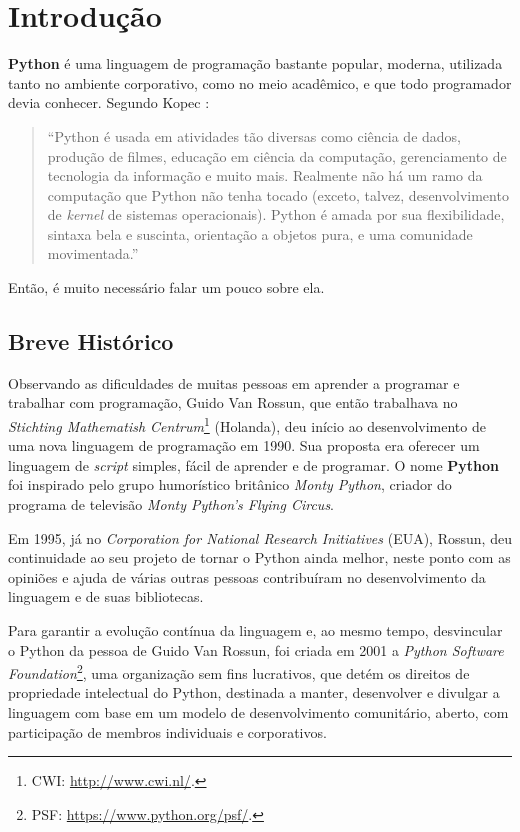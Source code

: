 \documentclass[
]{book}
\begin{document}
\hypertarget{intro}{%
\chapter{Introdução}\label{intro}}

\textbf{Python} é uma linguagem de programação bastante popular, moderna, utilizada tanto no ambiente corporativo, como no meio acadêmico, e que todo programador devia conhecer. Segundo Kopec \citep[pág.1]{kop2019}:

\begin{quote}
``Python é usada em atividades tão diversas como ciência de dados, produção de filmes, educação em ciência da computação, gerenciamento de tecnologia da informação e muito mais. Realmente não há um ramo da computação que Python não tenha tocado (exceto, talvez, desenvolvimento de \emph{kernel} de sistemas operacionais). Python é amada por sua flexibilidade, sintaxa bela e suscinta, orientação a objetos pura, e uma comunidade movimentada.''
\end{quote}

Então, é muito necessário falar um pouco sobre ela.

\hypertarget{introd-histo}{%
\section{Breve Histórico}\label{introd-histo}}

Observando as dificuldades de muitas pessoas em aprender a programar e trabalhar com programação, Guido Van Rossun, que então trabalhava no \emph{Stichting Mathematish Centrum}\footnote{CWI: \url{http://www.cwi.nl/}.} (Holanda), deu início ao desenvolvimento de uma nova linguagem de programação em 1990. Sua proposta era oferecer um linguagem de \emph{script} simples, fácil de aprender e de programar. O nome \textbf{Python} foi inspirado pelo grupo humorístico britânico \emph{Monty Python}, criador do programa de televisão \emph{Monty Python's Flying Circus}.

Em 1995, já no \emph{Corporation for National Research Initiatives} (EUA), Rossun, deu continuidade ao seu projeto de tornar o Python ainda melhor, neste ponto com as opiniões e ajuda de várias outras pessoas contribuíram no desenvolvimento da linguagem e de suas bibliotecas.

Para garantir a evolução contínua da linguagem e, ao mesmo tempo, desvincular o Python da pessoa de Guido Van Rossun, foi criada em 2001 a \emph{Python Software Foundation}\footnote{PSF: \url{https://www.python.org/psf/}.}, uma organização sem fins lucrativos, que detém os direitos de propriedade intelectual do Python, destinada a manter, desenvolver e divulgar a linguagem com base em um modelo de desenvolvimento comunitário, aberto, com participação de membros individuais e corporativos.
\end{document}
